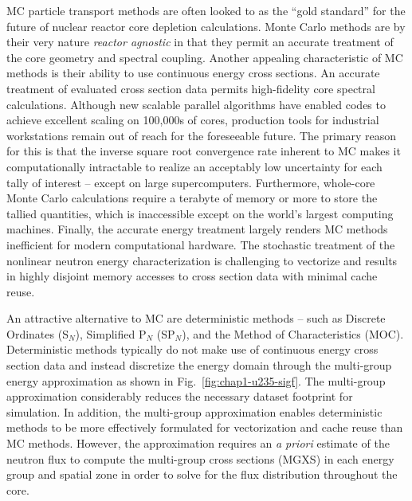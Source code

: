 
\ac{MC} particle transport methods are often looked to as the ``gold standard'' for the future of nuclear reactor core depletion calculations. Monte Carlo methods are by their very nature \textit{reactor agnostic} in that they permit an accurate treatment of the core geometry and spectral coupling. Another appealing characteristic of \ac{MC} methods is their ability to use continuous energy cross sections. An accurate treatment of evaluated cross section data permits high-fidelity core spectral calculations. Although new scalable parallel algorithms have enabled codes to achieve excellent scaling on 100,000s of cores, production tools for industrial workstations remain out of reach for the foreseeable future. The primary reason for this is that the inverse square root convergence rate inherent to \ac{MC} makes it computationally intractable to realize an acceptably low uncertainty for each tally of interest -- except on large supercomputers. Furthermore, whole-core Monte Carlo calculations require a terabyte of memory or more to store the tallied quantities, which is inaccessible except on the world's largest computing machines. Finally, the accurate energy treatment largely renders \ac{MC} methods inefficient for modern computational hardware. The stochastic treatment of the nonlinear neutron energy characterization is challenging to vectorize and results in highly disjoint memory accesses to cross section data with minimal cache reuse. 

An attractive alternative to MC are deterministic methods -- such as Discrete Ordinates (S$_N$), Simplified P$_N$ (SP$_N$), and the Method of Characteristics (MOC). Deterministic methods typically do not make use of continuous energy cross section data and instead discretize the energy domain through the multi-group energy approximation as shown in Fig.~\ref{fig:chap1-u235-sigf}. The multi-group approximation considerably reduces the necessary dataset footprint for simulation. In addition, the multi-group approximation enables deterministic methods to be more effectively formulated for vectorization and cache reuse than \ac{MC} methods. However, the approximation requires an \textit{a priori} estimate of the neutron flux to compute the multi-group cross sections (MGXS) in each energy group and spatial zone in order to solve for the flux distribution throughout the core.

